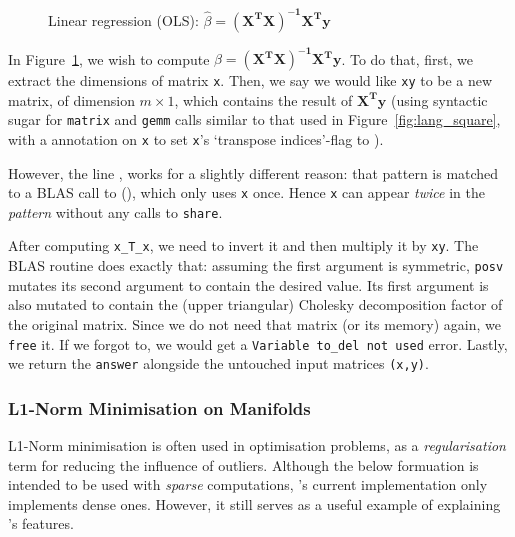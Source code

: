 \begin{figure}[t]
    \centering
    \inputminted[fontsize=\small]{ocaml}{../../examples/lin_reg.lt}
    \caption{Linear regression (OLS): $\hat\beta =
        \mathbf{(X^T X)^{-1} X^T y}$}\label{fig:lang_lin_reg}
\end{figure}

In Figure~\ref{fig:lang_lin_reg}, we wish to compute $\hat\beta = \mathbf{(X^T
X)^{-1} X^T y}$. To do that, first, we extract the dimensions of matrix
\texttt{x}. Then, we say we would like \texttt{xy} to be a new matrix, of
dimension $m \times 1$, which contains the result of $\mathbf{X^T y}$ (using
syntactic sugar for \texttt{matrix} and \texttt{gemm} calls similar to that
used in Figure~\ref{fig:lang_square}, with a  annotation on
\texttt{x} to set \texttt{x}'s `transpose indices'-flag to ).

However, the line , works for a
slightly different reason: that pattern is matched to a BLAS call to
(), which only uses \texttt{x} once. Hence
\texttt{x} can appear \emph{twice} in the \emph{pattern} without any calls to
\texttt{share}.

After computing \texttt{x\_T\_x}, we need to invert it and then multiply it by
\texttt{xy}. The BLAS routine 
does exactly that: assuming the first argument is symmetric, \texttt{posv}
mutates its second argument to contain the desired value. Its first argument is
also mutated to contain the (upper triangular) Cholesky decomposition factor of
the original matrix. Since we do not need that matrix (or its memory) again, we
\texttt{free} it. If we forgot to, we would get a \texttt{Variable to\_del not
used} error. Lastly, we return the \texttt{answer} alongside the untouched
input matrices \texttt{(x,y)}.

\subsubsection{L1-Norm Minimisation on Manifolds}

L1-Norm minimisation is often used in optimisation problems, as a
\emph{regularisation} term for reducing the influence of outliers.  Although
the below formuation\cite{bronstein} is intended to be used with \emph{sparse}
computations, \lang's current implementation only implements dense ones.
However, it still serves as a useful example of explaining \lang's features.

